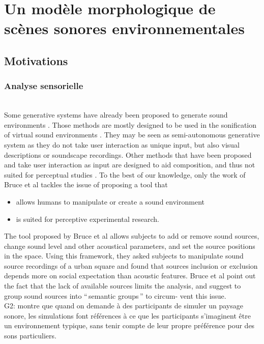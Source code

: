 \chapter{Un modèle morphologique de scènes sonores environnementales}\label{ch:psycho_model} %

\section{Motivations}

\subsection{Analyse sensorielle}

 \\

 Some generative systems have already been proposed to generate sound environments \citep{misra2006new,misra2007musical,valle2009framework,finney2010soundscape,schirosa2010system}. Those methods are mostly designed to be used in the sonification of virtual sound environments \citep{valle2009framework,finney2010soundscape}. They may be seen as semi-autonomous generative system as they do not take user interaction as unique input, but also visual descriptions or soundscape recordings. Other methods that have been proposed and take user interaction as input are designed to aid composition, and thus not suited for perceptual studies \citep{misra2006new,misra2007musical}. To the best of our knowledge, only the work of Bruce et al \citep{bruce2009development,bruce2014effects} tackles the issue of proposing a tool that 

\begin{itemize}
\item allows humans to manipulate or create a sound environment
\item  is suited for perceptive experimental research.
\end{itemize}
 
The tool proposed by Bruce et al allows subjects to add or remove sound sources, change sound level and other acoustical parameters, and set the source positions in the space. Using this framework, they asked subjects to manipulate sound source recordings of a urban square and found that sources inclusion or exclusion depends more on social expectation than acoustic features. Bruce et al point out the fact that the lack of available sources limits the analysis, and suggest to group sound sources into ``\,semantic groups\,'' to circum-
vent this issue. \\
G2: \citep{davies2014soundscape} montre que quand on demande à des participants de simuler un paysage sonore, les simulations font références à ce que les participants s'imaginent être un environnement typique, sans tenir compte de leur propre préférence pour des sons particuliers.

